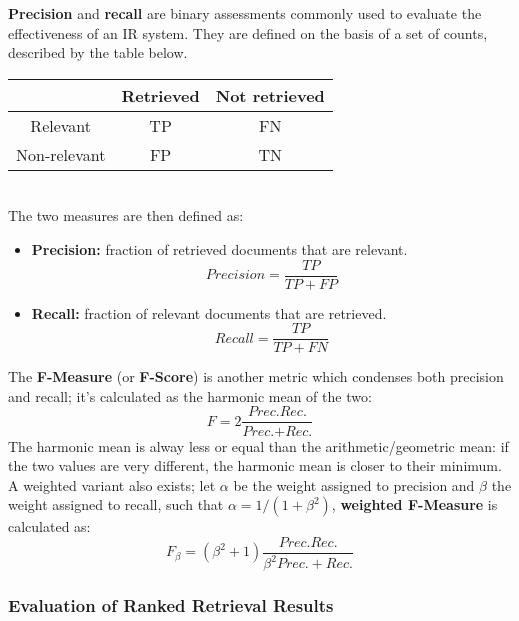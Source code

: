 \textbf{Precision} and \textbf{recall} are binary assessments commonly used to evaluate the effectiveness of an IR system. They are defined on the basis of a set of counts, described by the table below.
\begin{table}[ht]
    \centering
    \begin{tabular}{|c|c|c|}
         \hline
         & Retrieved & Not retrieved \\
        \hline
        Relevant & TP & FN \\
        \hline
        Non-relevant & FP & TN \\
        \hline
    \end{tabular}
\end{table} \\
The two measures are then defined as:
\begin{itemize}
    \item \textbf{Precision:} fraction of retrieved documents that are relevant.
    \begin{equation*}
            \textit{Precision} = \frac{TP}{TP + FP}
    \end{equation*}
    
    \item \textbf{Recall:} fraction of relevant documents that are retrieved.
    \begin{equation*}
        \textit{Recall} = \frac{TP}{TP + FN}
    \end{equation*}
\end{itemize}
The \textbf{F-Measure} (or \textbf{F-Score}) is another metric which condenses both precision and recall; it's calculated as the harmonic mean of the two:
\begin{equation*}
    F = 2 \frac{\textit{Prec.}\textit{Rec.}}{\textit{Prec.} + \textit{Rec.}}
\end{equation*}
The harmonic mean is alway less or equal than the arithmetic/geometric mean: if the two values are very different, the harmonic mean is closer to their minimum. A weighted variant also exists; let $\alpha$ be the weight assigned to precision and $\beta$ the weight assigned to recall, such that $\alpha = 1/(1+\beta^2)$, \textbf{weighted F-Measure} is calculated as:
\begin{equation*}
    F_{\beta} = (\beta^2 + 1)\frac{\textit{Prec.}\textit{Rec.}}{\beta^2 \textit{Prec.} + \textit{Rec.}}
\end{equation*}

\subsubsection{Evaluation of Ranked Retrieval Results}

